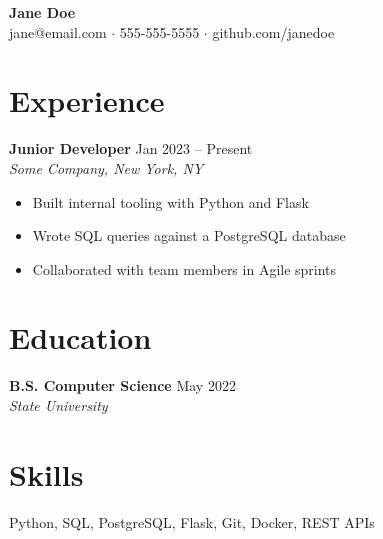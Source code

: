 \documentclass[11pt, letterpaper]{article}
\begin{document}
\begin{center}
  {\LARGE \textbf{Jane Doe}} \\[4pt]
  jane@email.com $\cdot$ 555-555-5555 $\cdot$ github.com/janedoe
\end{center}

\section*{Experience}

\textbf{Junior Developer} \hfill Jan 2023 -- Present \\
\textit{Some Company, New York, NY}
\begin{itemize}[nosep]
  \item Built internal tooling with Python and Flask
  \item Wrote SQL queries against a PostgreSQL database
  \item Collaborated with team members in Agile sprints
\end{itemize}

\section*{Education}

\textbf{B.S. Computer Science} \hfill May 2022 \\
\textit{State University}

\section*{Skills}

Python, SQL, PostgreSQL, Flask, Git, Docker, REST APIs
\end{document}
